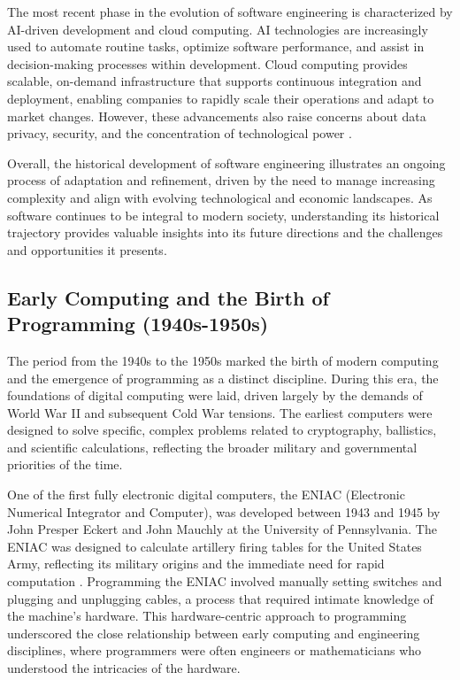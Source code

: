 \begin{refsection}
The most recent phase in the evolution of software engineering is characterized by AI-driven development and cloud computing. AI technologies are increasingly used to automate routine tasks, optimize software performance, and assist in decision-making processes within development. Cloud computing provides scalable, on-demand infrastructure that supports continuous integration and deployment, enabling companies to rapidly scale their operations and adapt to market changes. However, these advancements also raise concerns about data privacy, security, and the concentration of technological power \cite[pp.~98-101]{brynjolfsson2017machine}.

Overall, the historical development of software engineering illustrates an ongoing process of adaptation and refinement, driven by the need to manage increasing complexity and align with evolving technological and economic landscapes. As software continues to be integral to modern society, understanding its historical trajectory provides valuable insights into its future directions and the challenges and opportunities it presents.

\subsection{Early Computing and the Birth of Programming (1940s-1950s)}

The period from the 1940s to the 1950s marked the birth of modern computing and the emergence of programming as a distinct discipline. During this era, the foundations of digital computing were laid, driven largely by the demands of World War II and subsequent Cold War tensions. The earliest computers were designed to solve specific, complex problems related to cryptography, ballistics, and scientific calculations, reflecting the broader military and governmental priorities of the time.

One of the first fully electronic digital computers, the ENIAC (Electronic Numerical Integrator and Computer), was developed between 1943 and 1945 by John Presper Eckert and John Mauchly at the University of Pennsylvania. The ENIAC was designed to calculate artillery firing tables for the United States Army, reflecting its military origins and the immediate need for rapid computation \cite[pp.~33-36]{ceruzzi2003history}. Programming the ENIAC involved manually setting switches and plugging and unplugging cables, a process that required intimate knowledge of the machine's hardware. This hardware-centric approach to programming underscored the close relationship between early computing and engineering disciplines, where programmers were often engineers or mathematicians who understood the intricacies of the hardware.


\end{refsection}
